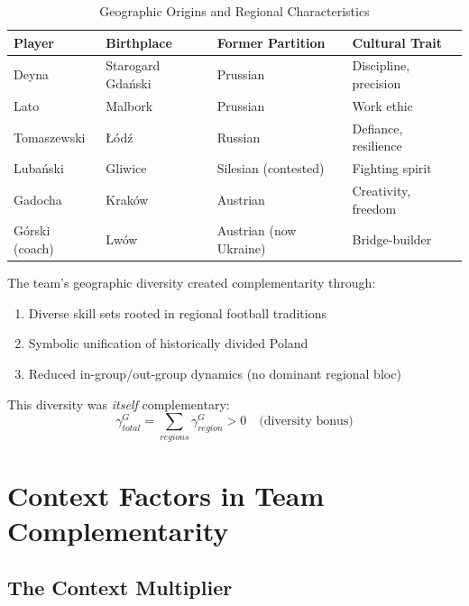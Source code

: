 \begin{table}[h]
\centering
\caption{Geographic Origins and Regional Characteristics}
\label{tab:partition}
\begin{tabular}{llll}
\toprule
\textbf{Player} & \textbf{Birthplace} & \textbf{Former Partition} & \textbf{Cultural Trait} \\
\midrule
Deyna & Starogard Gdański & Prussian & Discipline, precision \\
Lato & Malbork & Prussian & Work ethic \\
Tomaszewski & Łódź & Russian & Defiance, resilience \\
Lubański & Gliwice & Silesian (contested) & Fighting spirit \\
Gadocha & Kraków & Austrian & Creativity, freedom \\
Górski (coach) & Lwów & Austrian (now Ukraine) & Bridge-builder \\
\bottomrule
\end{tabular}
\end{table}

\begin{proposition}
The team's geographic diversity created complementarity through:
\begin{enumerate}
    \item Diverse skill sets rooted in regional football traditions
    \item Symbolic unification of historically divided Poland
    \item Reduced in-group/out-group dynamics (no dominant regional bloc)
\end{enumerate}
\end{proposition}

This diversity was \textit{itself} complementary:
\begin{equation}
\gamma^{G}_{total} = \sum_{regions} \gamma^{G}_{region} > 0 \quad \text{(diversity bonus)}
\end{equation}



\section{Context Factors in Team Complementarity}
\label{sec:bm-context}

\subsection{The Context Multiplier}

